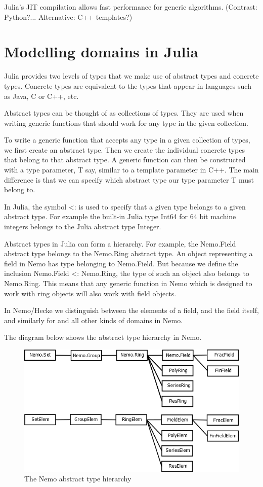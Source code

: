 \documentclass{sig-alternate-05-2015}
\begin{document}
Julia's JIT compilation allows fast performance for
generic algorithms. (Contrast: Python?... Alternative: C++ templates?)

\section{Modelling domains in Julia}

Julia provides two levels of types that we make use of abstract types and concrete types.
Concrete types are equivalent to the types that appear in languages such as Java, C or C++,
etc.

Abstract types can be thought of as collections of types. They are used when writing generic
functions that should work for any type in the given collection.

To write a generic function that accepts any type in a given collection of types, we first
create an abstract type. Then we create the individual concrete types that belong to that
abstract type. A generic function can then be constructed with a type parameter, T
say, similar to a template parameter in C++. The main difference is that we can specify
which abstract type our type parameter T must belong to.

In Julia, the symbol <: is used to specify that a given type belongs to a given abstract type.
For example the built-in Julia type Int64 for 64 bit machine integers belongs to the Julia
abstract type Integer.

Abstract types in Julia can form a hierarchy. For example, the Nemo.Field abstract type belongs
to the Nemo.Ring abstract type. An object representing a field in Nemo has type belonging to
Nemo.Field. But because we define the inclusion Nemo.Field <: Nemo.Ring, the type of such an
object also belongs to Nemo.Ring. This means that any generic function in Nemo which is designed
to work with ring objects will also work with field objects.

In Nemo/Hecke we distinguish between the elements of a field, and the field itself, and similarly
for and all other kinds of domains in Nemo. 

The diagram below shows the abstract type hierarchy in Nemo.

\begin{figure}[h]
\centering
\includegraphics[scale=0.37]{types.png}
\caption{The Nemo abstract type hierarchy}
\end{figure}
\end{document}
